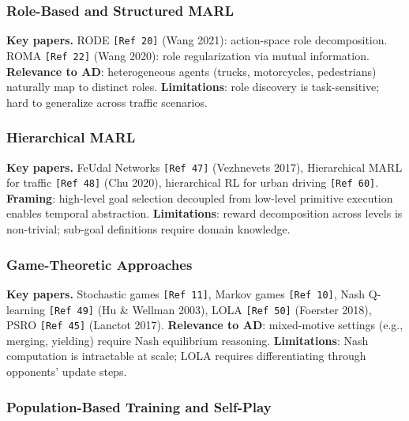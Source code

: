 \documentclass[12pt, a4paper]{article}
\begin{document}
\subsubsection{Role-Based and Structured MARL}

\begin{outline_note}
\textbf{Key papers.}
RODE \texttt{[Ref\,20]} (Wang 2021): action-space role decomposition.
ROMA \texttt{[Ref\,22]} (Wang 2020): role regularization via mutual information.
\textbf{Relevance to AD}: heterogeneous agents (trucks, motorcycles, pedestrians)
naturally map to distinct roles.
\textbf{Limitations}: role discovery is task-sensitive; hard to generalize
across traffic scenarios.
\end{outline_note}

\subsubsection{Hierarchical MARL}

\begin{outline_note}
\textbf{Key papers.}
FeUdal Networks \texttt{[Ref\,47]} (Vezhnevets 2017),
Hierarchical MARL for traffic \texttt{[Ref\,48]} (Chu 2020),
hierarchical RL for urban driving \texttt{[Ref\,60]}.
\textbf{Framing}: high-level goal selection decoupled from low-level
primitive execution enables temporal abstraction.
\textbf{Limitations}: reward decomposition across levels is non-trivial;
sub-goal definitions require domain knowledge.
\end{outline_note}

\subsubsection{Game-Theoretic Approaches}

\begin{outline_note}
\textbf{Key papers.}
Stochastic games \texttt{[Ref\,11]},
Markov games \texttt{[Ref\,10]},
Nash Q-learning \texttt{[Ref\,49]} (Hu \& Wellman 2003),
LOLA \texttt{[Ref\,50]} (Foerster 2018),
PSRO \texttt{[Ref\,45]} (Lanctot 2017).
\textbf{Relevance to AD}: mixed-motive settings (e.g., merging, yielding)
require Nash equilibrium reasoning.
\textbf{Limitations}: Nash computation is intractable at scale; LOLA
requires differentiating through opponents' update steps.
\end{outline_note}

\subsubsection{Population-Based Training and Self-Play}
\end{document}
